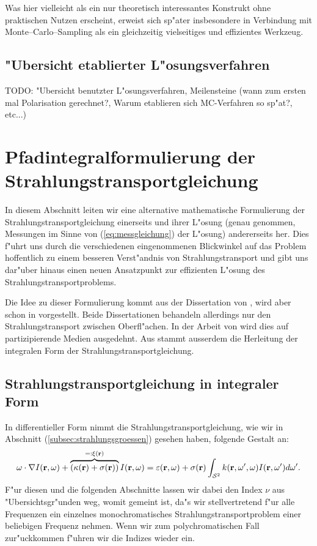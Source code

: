 \documentclass[11pt,a4paper,DIVcalc,BCOR8mm,titlepage,twoside]{scrartcl}
\begin{document}
	Was hier vielleicht als ein nur theoretisch interessantes Konstrukt ohne praktischen Nutzen erscheint, erweist sich sp"ater insbesondere in Verbindung mit Monte--Carlo--Sampling als ein gleichzeitig vielseitiges und effizientes Werkzeug.	
	
	
	\subsection{"Ubersicht etablierter L"osungsverfahren}
	TODO: "Ubersicht benutzter L"osungsverfahren, Meilensteine (wann zum ersten mal Polarisation gerechnet?, Warum etablieren sich MC-Verfahren so sp"at?, etc...)
		
	\section{Pfadintegralformulierung der Strahlungstransportgleichung}
	In diesem Abschnitt leiten wir eine alternative mathematische Formulierung der Strahlungstransportgleichung einerseits und ihrer L"osung (genau genommen, Messungen im Sinne von (\ref{eq:messgleichung}) der L"osung) andererseits her. Dies f"uhrt uns durch die verschiedenen eingenommenen Blickwinkel auf das Problem hoffentlich zu einem besseren Verst"andnis von Strahlungstransport und gibt uns dar"uber hinaus einen neuen Ansatzpunkt zur effizienten L"osung des Strahlungstransportproblems.
	
	Die Idee zu dieser Formulierung kommt aus der Dissertation von \citet{Veach:1997p9136}, wird aber schon in \citep{Arvo:1995p9257} vorgestellt. Beide Dissertationen behandeln allerdings nur den Strahlungstransport zwischen Oberfl"achen. In der Arbeit von \citet{Pauly:2000p5705} wird dies auf partizipierende Medien ausgedehnt. Aus \citep{Arvo:1993p9035} stammt ausserdem die Herleitung der integralen Form der Strahlungstransportgleichung.
	
	
	\subsection{Strahlungstransportgleichung in integraler Form}
	In differentieller Form nimmt die Strahlungstransportgleichung, wie wir in Abschnitt (\ref{subsec:strahlungsgroessen}) gesehen haben, folgende Gestalt an:
		\begin{equation}
			\omega \cdot \nabla I(\mathbf{r},\omega)+\overbrace{\left(\kappa(\mathbf{r})+\sigma(\mathbf{r})\right)}^{=:\xi(\mathbf{r})}I(\mathbf{r},\omega)=\varepsilon(\mathbf{r},\omega)+\sigma(\mathbf{r}) \int_{\mathcal{S}^2} k(\mathbf{r},\omega',\omega)I(\mathbf{r},\omega') d\omega'.
			\label{eq:diff.STG}
		\end{equation}
	F"ur diesen und die folgenden Abschnitte lassen wir dabei den Index $\nu$ aus "Ubersichtsgr"unden weg, womit gemeint ist, da"s wir stellvertretend f"ur alle Frequenzen ein einzelnes monochromatisches Strahlungstransportproblem einer beliebigen Frequenz nehmen. Wenn wir zum polychromatischen Fall zur"uckkommen f"uhren wir die Indizes wieder ein.
	
\end{document}
